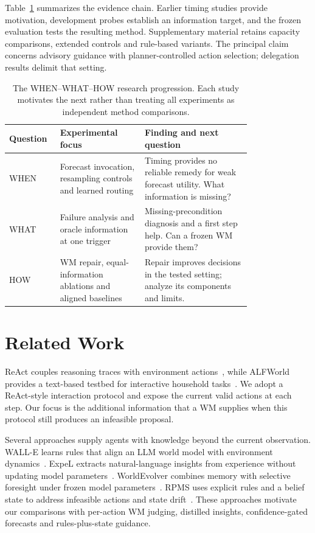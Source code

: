 \documentclass[runningheads]{llncs}
\begin{document}
Table~\ref{tab:research-roadmap} summarizes the evidence chain. Earlier timing studies provide motivation, development probes establish an information target, and the frozen evaluation tests the resulting method. Supplementary material retains capacity comparisons, extended controls and rule-based variants. The principal claim concerns advisory guidance with planner-controlled action selection; delegation results delimit that setting.

\begin{table}[tbp]
\caption{The WHEN--WHAT--HOW research progression. Each study motivates the next rather than treating all experiments as independent method comparisons.}
\label{tab:research-roadmap}\centering
\begin{tabular}{lp{0.35\linewidth}p{0.44\linewidth}}\toprule
Question & Experimental focus & Finding and next question\\\midrule
WHEN & Forecast invocation, resampling controls and learned routing & Timing provides no reliable remedy for weak forecast utility. What information is missing?\\
WHAT & Failure analysis and oracle information at one trigger & Missing-precondition diagnosis and a first step help. Can a frozen WM provide them?\\
HOW & WM repair, equal-information ablations and aligned baselines & Repair improves decisions in the tested setting; analyze its components and limits.\\\bottomrule
\end{tabular}
\end{table}

\section{Related Work}
ReAct couples reasoning traces with environment actions~\cite{react}, while ALFWorld provides a text-based testbed for interactive household tasks~\cite{alfworld}. We adopt a ReAct-style interaction protocol and expose the current valid actions at each step. Our focus is the additional information that a WM supplies when this protocol still produces an infeasible proposal.

Several approaches supply agents with knowledge beyond the current observation. WALL-E learns rules that align an LLM world model with environment dynamics~\cite{walle}. ExpeL extracts natural-language insights from experience without updating model parameters~\cite{expel}. WorldEvolver combines memory with selective foresight under frozen model parameters~\cite{worldevolver}. RPMS uses explicit rules and a belief state to address infeasible actions and state drift~\cite{rpms}. These approaches motivate our comparisons with per-action WM judging, distilled insights, confidence-gated forecasts and rules-plus-state guidance.
\end{document}
